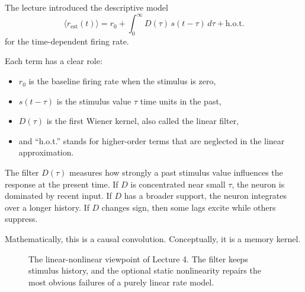 The lecture introduced the descriptive model
\[
\langle r_{\mathrm{est}}(t)\rangle = r_0 + \int_0^{\infty} D(\tau)\,s(t-\tau)\,d\tau + \text{h.o.t.}
\]
for the time-dependent firing rate.

Each term has a clear role:
\begin{itemize}
    \item $r_0$ is the baseline firing rate when the stimulus is zero,
    \item $s(t-\tau)$ is the stimulus value $\tau$ time units in the past,
    \item $D(\tau)$ is the first Wiener kernel, also called the linear filter,
    \item and ``h.o.t.'' stands for higher-order terms that are neglected in the linear approximation.
\end{itemize}

The filter $D(\tau)$ measures how strongly a past stimulus value influences the response at the present time. If $D$ is concentrated near small $\tau$, the neuron is dominated by recent input. If $D$ has a broader support, the neuron integrates over a longer history. If $D$ changes sign, then some lags excite while others suppress.

Mathematically, this is a causal convolution. Conceptually, it is a memory kernel.

\begin{figure}[h]
\centering
{}
\caption{The linear-nonlinear viewpoint of Lecture 4. The filter keeps stimulus history, and the optional static nonlinearity repairs the most obvious failures of a purely linear rate model.}
\end{figure}

